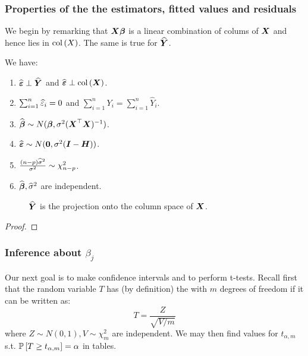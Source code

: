\subsubsection{Properties of the the estimators, fitted values and residuals}
We begin by remarking that $\boldsymbol{X}\boldsymbol{\beta}$ is a linear combination of colums of $\boldsymbol{X}$ and hence lies in $\mathrm{col}\left(X\right)$. The same is true for $\widehat{\boldsymbol{Y}}$. 
\begin{proposition}
    We have:
    \begin{enumerate}
        \item $\widehat{\boldsymbol{\varepsilon}}\perp\widehat{\boldsymbol{Y}}$ and $\widehat{\boldsymbol{\varepsilon}}\perp\mathrm{col}\left(\boldsymbol{X}\right)$.
        \item $\sum_{i=1}^n \widehat{\varepsilon}_i = 0$ and $\sum_{i=1}^n Y_i = \sum_{i=1}^n \hat{Y}_i$.
        \item $\widehat{\boldsymbol{\beta}} \sim N(\boldsymbol{\beta}, \sigma^2(\boldsymbol{X}^\top\boldsymbol{X})^{-1})$.
        \item $\widehat{\boldsymbol{\varepsilon}} \sim N(\boldsymbol{0}, \sigma^2(\boldsymbol{I}-\boldsymbol{H}))$.
        \item $\frac{(n-p)\widehat{\sigma}^2}{\sigma^2} \sim \chi^2_{n-p}$.
        \item $\widehat{\boldsymbol{\beta}}, \widehat{\sigma}^2$ are independent.
    \end{enumerate}
\end{proposition}

\begin{figure}[H] \centering
    \caption{$\widehat{\boldsymbol{Y}}$ is the projection onto the column space of $\boldsymbol{X}$.}   
\end{figure}

\begin{proof}
\end{proof}

\subsubsection{Inference about $\beta_j$}
Our next goal is to make confidence intervals and to perform t-tests. Recall first that the random variable $T$ has (by definition) the  with $m$ degrees of freedom if it can be written as:
$$
    T = \frac{Z}{\sqrt{V/m}}
$$
where $Z\sim N(0,1), V\sim\chi^2_m$ are independent. We may then find values for $t_{\alpha, m}$ s.t. $\mathbb{P}\left[T\geq t_{\alpha, m}\right]=\alpha$ in tables. 

